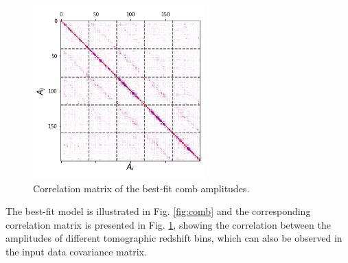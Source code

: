 \documentclass{aa}
\begin{document}
\begin{figure}
\centering
\includegraphics[scale=0.7]{plots/corr.png}
\caption{Correlation matrix of the best-fit comb amplitudes.}
\label{fig:correlation_matrix}
\end{figure}
The best-fit model is illustrated in Fig. \ref{fig:comb} and the corresponding correlation matrix  is presented in Fig. \ref{fig:correlation_matrix}, showing the correlation between the amplitudes of different tomographic redshift bins, which can also be observed in the input data covariance matrix.  
\end{document}
